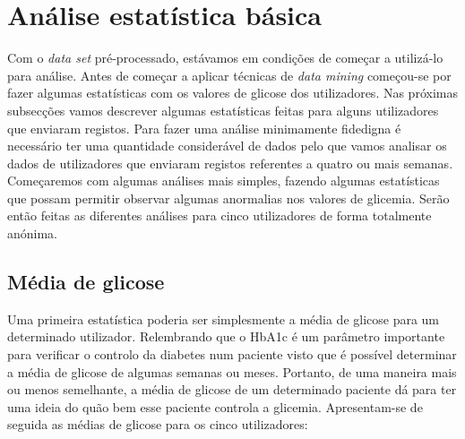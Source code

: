 \section{Análise estatística básica}

Com o \textit{data set} pré-processado, estávamos em condições de começar a utilizá-lo para análise. Antes de começar a aplicar técnicas de \textit{data mining} começou-se por fazer algumas estatísticas com os valores de glicose dos utilizadores. Nas próximas subsecções vamos descrever algumas estatísticas feitas para alguns utilizadores que enviaram registos. Para fazer uma análise minimamente fidedigna é necessário ter uma quantidade considerável de dados pelo que vamos analisar os dados de utilizadores que enviaram registos referentes a quatro ou mais semanas. Começaremos com algumas análises mais simples, fazendo algumas estatísticas que possam permitir observar algumas anormalias nos valores de glicemia. Serão então feitas as diferentes análises para cinco utilizadores de forma totalmente anónima.


\subsection{Média de glicose}

Uma primeira estatística poderia ser simplesmente a média de glicose para um determinado utilizador. Relembrando que o HbA1c é um parâmetro importante para verificar o controlo da diabetes num paciente visto que é possível determinar a média de glicose de algumas semanas ou meses. Portanto, de uma maneira mais ou menos semelhante, a média de glicose de um determinado paciente dá para ter uma ideia do quão bem esse paciente controla a glicemia. Apresentam-se de seguida as médias de glicose para os cinco utilizadores:

